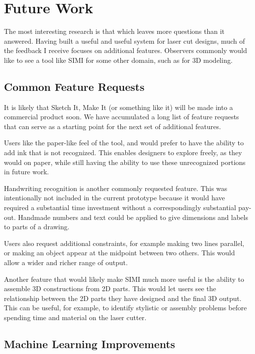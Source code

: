 \section{Future Work}

The most interesting research is that which leaves more questions than
it answered. Having built a useful and useful system for laser cut
designs, much of the feedback I receive focuses on additional
features. Observers commonly would like to see a tool like SIMI for
some other domain, such as for 3D modeling.

\subsection{Common Feature Requests}

It is likely that Sketch It, Make It (or something like it) will be
made into a commercial product soon. We have accumulated a long list
of feature requests that can serve as a starting point for the next
set of additional features.

Users like the paper-like feel of the tool, and would prefer to have
the ability to add ink that is not recognized. This enables designers
to explore freely, as they would on paper, while still having the
ability to use these unrecognized portions in future work.

Handwriting recognition is another commonly requested feature. This
was intentionally not included in the current prototype because it
would have required a substantial time investment without a
correspondingly substantial pay-out. Handmade numbers and text could
be applied to give dimensions and labels to parts of a drawing.

Users also request additional constraints, for example making two
lines parallel, or making an object appear at the midpoint between two
others. This would allow a wider and richer range of output.

Another feature that would likely make SIMI much more useful is the
ability to assemble 3D constructions from 2D parts. This would let
users see the relationship between the 2D parts they have designed and
the final 3D output. This can be useful, for example, to identify
stylistic or assembly problems before spending time and material on
the laser cutter.

\subsection{Machine Learning Improvements}

